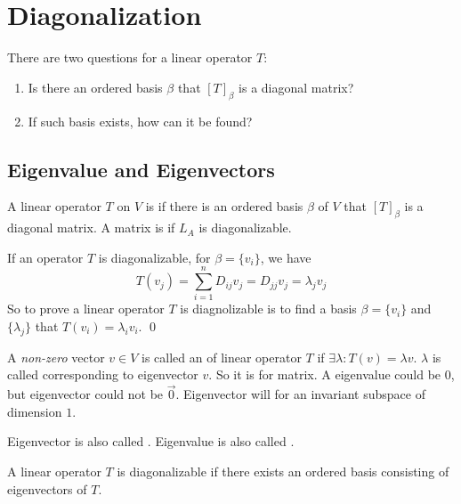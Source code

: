 \section{Diagonalization}


There are two questions for a linear operator $T$:
\begin{enumerate}
    \item Is there an ordered basis $\beta$ that $[T]_\beta$ is a diagonal matrix?
    \item If such basis exists, how can it be found?
\end{enumerate}


\subsection{Eigenvalue and Eigenvectors}

\begin{definition}
    A linear operator $T$ on $V$ is  if there is an ordered basis $\beta$ of $V$ that $[T]_\beta$ is a diagonal matrix. A matrix is  if $L_A$ is diagonalizable.


If an operator $T$ is diagonalizable, for $\beta = \{v_i\}$, we have
\begin{equation*}
    T(v_j) = \sum_{i=1}^n D_{ij} v_j = D_{jj} v_j = \lambda_j v_j
\end{equation*}
So to prove a  linear operator $T$ is diagnolizable is to find a basis $\beta = \{ v_i \}$ and $\{ \lambda_j \}$ that $T(v_i) = \lambda_i v_i$.
\qed
\end{definition}

\begin{definition}
    A \emph{non-zero} vector $v \in V$ is called an  of linear operator $T$ if $\exists \lambda : T(v) = \lambda v$. $\lambda$ is called  corresponding to eigenvector $v$. So it is for matrix. A eigenvalue could be $0$, but eigenvector could not be $\vec{0}$. Eigenvector will for an invariant subspace of dimension $1$.
\end{definition}

Eigenvector is also called . Eigenvalue is also called .

\begin{theorem}
    A linear operator $T$ is diagonalizable if there exists an ordered basis consisting of eigenvectors of $T$.
\end{theorem}

